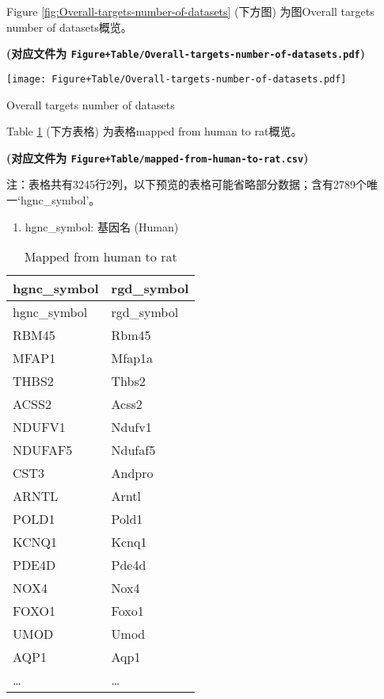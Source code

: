 \documentclass[
]{article}
\providecommand{\tightlist}{%
  \setlength{\itemsep}{0pt}\setlength{\parskip}{0pt}}
\begin{document}
Figure \ref{fig:Overall-targets-number-of-datasets} (下方图) 为图Overall targets number of datasets概览。

\textbf{(对应文件为 \texttt{Figure+Table/Overall-targets-number-of-datasets.pdf})}

\def\@captype{figure}
\begin{center}
\texttt{[image: Figure+Table/Overall-targets-number-of-datasets.pdf]}
\caption{Overall targets number of datasets}\label{fig:Overall-targets-number-of-datasets}
\end{center}

\begin{center}\vspace{1.5cm}\end{center}

\begin{center}\vspace{1.5cm}\end{center}

Table \ref{tab:mapped-from-human-to-rat} (下方表格) 为表格mapped from human to rat概览。

\textbf{(对应文件为 \texttt{Figure+Table/mapped-from-human-to-rat.csv})}

\begin{center}\begin{tcolorbox}[colback=gray!10, colframe=gray!50, width=0.9\linewidth, arc=1mm, boxrule=0.5pt]注：表格共有3245行2列，以下预览的表格可能省略部分数据；含有2789个唯一`hgnc\_symbol'。
\end{tcolorbox}
\end{center}
\begin{center}\begin{tcolorbox}[colback=gray!10, colframe=gray!50, width=0.9\linewidth, arc=1mm, boxrule=0.5pt]\begin{enumerate}\tightlist
\item hgnc\_symbol:  基因名 (Human)
\end{enumerate}\end{tcolorbox}
\end{center}

\begin{longtable}[]{@{}ll@{}}
\caption{\label{tab:mapped-from-human-to-rat}Mapped from human to rat}\tabularnewline
\toprule
hgnc\_symbol & rgd\_symbol\tabularnewline
\midrule
\endfirsthead
\toprule
hgnc\_symbol & rgd\_symbol\tabularnewline
\midrule
\endhead
RBM45 & Rbm45\tabularnewline
MFAP1 & Mfap1a\tabularnewline
THBS2 & Thbs2\tabularnewline
ACSS2 & Acss2\tabularnewline
NDUFV1 & Ndufv1\tabularnewline
NDUFAF5 & Ndufaf5\tabularnewline
CST3 & Andpro\tabularnewline
ARNTL & Arntl\tabularnewline
POLD1 & Pold1\tabularnewline
KCNQ1 & Kcnq1\tabularnewline
PDE4D & Pde4d\tabularnewline
NOX4 & Nox4\tabularnewline
FOXO1 & Foxo1\tabularnewline
UMOD & Umod\tabularnewline
AQP1 & Aqp1\tabularnewline
\ldots{} & \ldots{}\tabularnewline
\bottomrule
\end{longtable}
\end{document}

